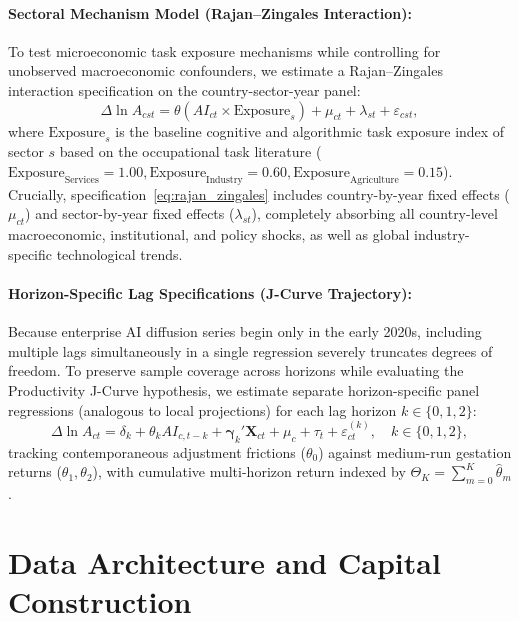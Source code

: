 \documentclass[11pt,a4paper]{article}
\begin{document}
\paragraph{Sectoral Mechanism Model (Rajan--Zingales Interaction):}
To test microeconomic task exposure mechanisms while controlling for unobserved macroeconomic confounders, we estimate a Rajan--Zingales interaction specification on the country-sector-year panel:
\begin{equation}
    \Delta \ln A_{cst} = \theta \left( AI_{ct} \times \text{Exposure}_s \right) + \mu_{ct} + \lambda_{st} + \varepsilon_{cst},
    \label{eq:rajan_zingales}
\end{equation}
where $\text{Exposure}_s$ is the baseline cognitive and algorithmic task exposure index of sector $s$ based on the occupational task literature ($\text{Exposure}_{\text{Services}} = 1.00, \text{Exposure}_{\text{Industry}} = 0.60, \text{Exposure}_{\text{Agriculture}} = 0.15$). Crucially, specification~\eqref{eq:rajan_zingales} includes country-by-year fixed effects ($\mu_{ct}$) and sector-by-year fixed effects ($\lambda_{st}$), completely absorbing all country-level macroeconomic, institutional, and policy shocks, as well as global industry-specific technological trends.

\paragraph{Horizon-Specific Lag Specifications (J-Curve Trajectory):}
Because enterprise AI diffusion series begin only in the early 2020s, including multiple lags simultaneously in a single regression severely truncates degrees of freedom. To preserve sample coverage across horizons while evaluating the Productivity J-Curve hypothesis, we estimate separate horizon-specific panel regressions (analogous to local projections) for each lag horizon $k \in \{0, 1, 2\}$:
\begin{equation}
    \Delta \ln A_{ct} = \delta_k + \theta_k AI_{c, t-k} + \bm{\gamma}_k' \mathbf{X}_{ct} + \mu_c + \tau_t + \varepsilon_{ct}^{(k)}, \quad k \in \{0, 1, 2\},
    \label{eq:dist_lag}
\end{equation}
tracking contemporaneous adjustment frictions ($\theta_0$) against medium-run gestation returns ($\theta_1, \theta_2$), with cumulative multi-horizon return indexed by $\Theta_K = \sum_{m=0}^{K} \hat{\theta}_m$.

\section{Data Architecture and Capital Construction}
\label{sec:data}
\end{document}
